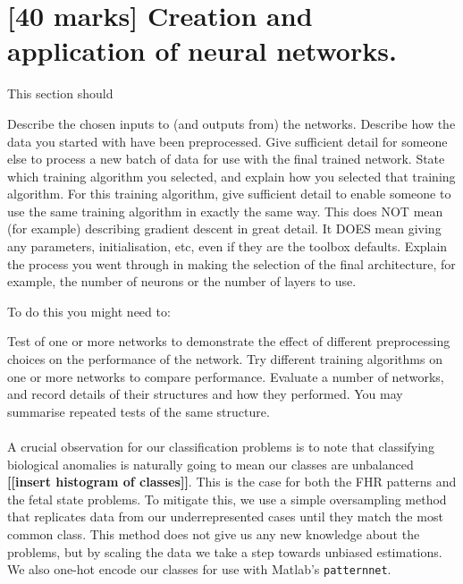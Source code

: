 \documentclass[11pt,a4paper]{article}
\begin{document}



\section{[40 marks] Creation and application of neural networks.}
\label{sec:creation}
This section should
\begin{outline}
  \1 Describe the chosen inputs to (and outputs from) the networks.
  \1 Describe how the data you started with have been preprocessed.
  \1 Give sufficient detail for someone else to process a new batch of data for use with the final trained network.
  \1 State which training algorithm you selected, and explain how you selected that training algorithm. For this training algorithm, give sufficient detail to enable someone to use the same training algorithm in exactly the same way. This does NOT mean (for example) describing gradient descent in great detail. It DOES mean giving any parameters, initialisation, etc, even if they are the toolbox defaults.
  \1 Explain the process you went through in making the selection of the final architecture, for example, the number of neurons or the number of layers to use.
\end{outline}

To do this you might need to:
\begin{outline}
  \1 Test of one or more networks to demonstrate the effect of different preprocessing choices on the performance of the network.
  \1 Try different training algorithms on one or more networks to compare performance.
  \1 Evaluate a number of networks, and record details of their structures and how they performed. You may summarise repeated tests of the same structure. 
\end{outline}
\paragraph{}
A crucial observation for our classification problems is to note that classifying biological anomalies is naturally going to mean our classes are unbalanced \textbf{[[insert histogram of classes]]}. This is the case for both the FHR patterns and the fetal state problems. To mitigate this, we use a simple oversampling method that replicates data from our underrepresented cases until they match the most common class. This method does not give us any new knowledge about the problems, but by scaling the data we take a step towards unbiased estimations. We also one-hot encode our classes for use with Matlab's \texttt{patternnet}.
\end{document}

